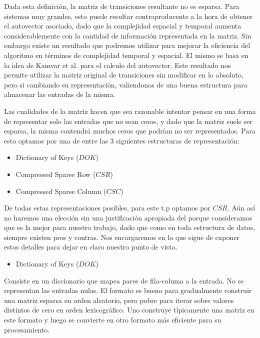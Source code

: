 Dada esta definición, la matriz de transiciones resultante no es esparsa. 
Para sistemas muy grandes, esto puede resultar contraproducente a la hora de obtener el autovector asociado, dado que la complejidad espacial y temporal aumenta  considerablemente con la cantidad de información representada en la matriz. Sin embargo existe un resultado que podremos utilizar para mejorar la eficiencia del algoritmo en términos de complejidad temporal y espacial. El mismo se basa en la idea de Kamvar et al. \cite[Algoritmo 1]{Kamvar2003} para el calculo del autovector. Este resultado nos permite utilizar la matriz original de transiciones sin modificar en lo absoluto, pero si cambiando su representación, valiendonos de una buena estructura para almacenar las entradas de la misma. 

Las cualidades de la matriz hacen que sea razonable intentar pensar en una forma de representar solo las entradas que no sean ceros, y dado que la matriz suele ser esparsa, la misma contendrá muchos ceros que podrían no ser representados. Para esto optamos por una de entre las 3 siguientes estructuras de representación:

\begin{itemize}
\item Dictionary of Keys ($DOK$)

\item Compressed Sparse Row ($CSR$)

\item Compressed Sparse Column ($CSC$)
\end{itemize}

De todas estas representaciones posibles, para este t.p optamos por $CSR$. Aún así no haremos una elección sin una justificación apropiada del porque consideramos que es la mejor para nuestro trabajo, dado que como en toda estructura de datos, siempre existen pros y contras. Nos encargaremos en lo que sigue de exponer estos detalles para dejar en claro nuestro punto de vista. 

\begin{itemize}
\item Dictionary of Keys ($DOK$)
\end{itemize}
Consiste en un diccionario que mapea pares de fila-columa a la entrada. No se representan las entradas nulas. El formato es bueno para gradualmente construir una matriz esparsa en orden aleatorio, pero pobre para iterar sobre valores distintos de cero en orden lexicográfico. Uno construye típicamente una matriz en este formato y luego se convierte en otro formato más eficiente para su procesamiento.

